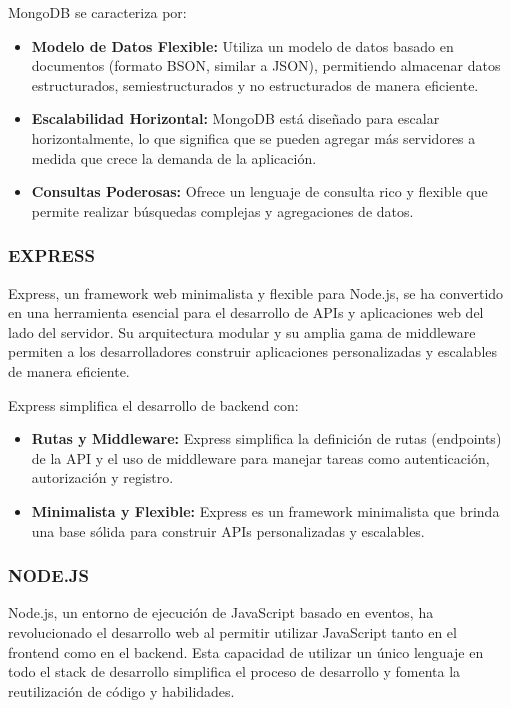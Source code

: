 MongoDB se caracteriza por:
\begin{itemize}
    \item \textbf{Modelo de Datos Flexible:} Utiliza un modelo de datos basado en documentos (formato BSON, similar a JSON), permitiendo almacenar datos estructurados, semiestructurados y no estructurados de manera eficiente.
    \item \textbf{Escalabilidad Horizontal:} MongoDB está diseñado para escalar horizontalmente, lo que significa que se pueden agregar más servidores a medida que crece la demanda de la aplicación.
    \item \textbf{Consultas Poderosas:} Ofrece un lenguaje de consulta rico y flexible que permite realizar búsquedas complejas y agregaciones de datos.
\end{itemize}

\subsubsection{EXPRESS}
Express, un framework web minimalista y flexible para Node.js, se ha convertido en una herramienta esencial para el desarrollo de APIs y aplicaciones web del lado del servidor. Su arquitectura modular y su amplia gama de middleware permiten a los desarrolladores construir aplicaciones personalizadas y escalables de manera eficiente. \citep{holmes2014pro}

Express simplifica el desarrollo de backend con:
\begin{itemize}
    \item \textbf{Rutas y Middleware:} Express simplifica la definición de rutas (endpoints) de la API y el uso de middleware para manejar tareas como autenticación, autorización y registro.
    \item \textbf{Minimalista y Flexible:} Express es un framework minimalista que brinda una base sólida para construir APIs personalizadas y escalables.
\end{itemize}

\subsubsection{NODE.JS}
Node.js, un entorno de ejecución de JavaScript basado en eventos, ha revolucionado el desarrollo web al permitir utilizar JavaScript tanto en el frontend como en el backend. Esta capacidad de utilizar un único lenguaje en todo el stack de desarrollo simplifica el proceso de desarrollo y fomenta la reutilización de código y habilidades. \citep{tilkov2016node}

